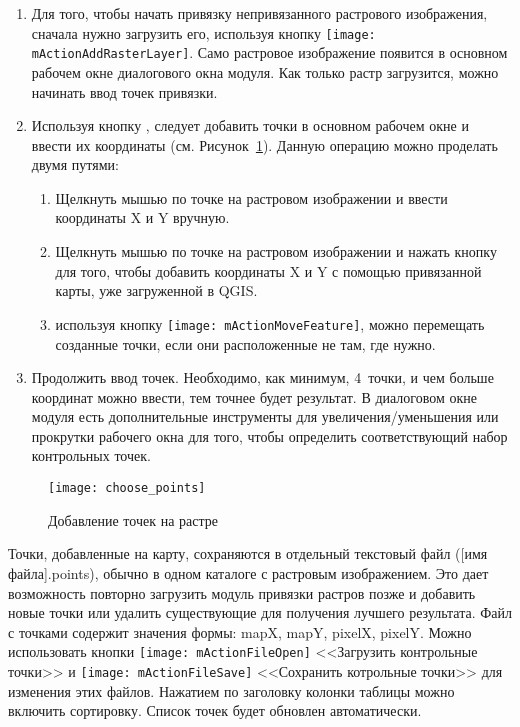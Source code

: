 \begin{enumerate}
\item Для того, чтобы начать привязку непривязанного растрового
изображения, сначала нужно загрузить его, используя кнопку
\texttt{[image: mActionAddRasterLayer]}. Само растровое
изображение появится в основном рабочем окне диалогового окна модуля.
Как только растр загрузится, можно начинать ввод точек привязки.
\item Используя кнопку ,
следует добавить точки в основном рабочем окне и ввести их координаты
(см. Рисунок~\ref{fig:choose_points}). Данную операцию можно проделать
двумя путями:

\begin{enumerate}
\item Щелкнуть мышью по точке на растровом изображении и ввести
координаты X и Y вручную.
\item Щелкнуть мышью по точке на растровом изображении и нажать кнопку
 для того, чтобы добавить координаты X и Y
с помощью привязанной карты, уже загруженной в QGIS.
\item используя кнопку \texttt{[image: mActionMoveFeature]},
можно перемещать созданные точки, если они расположенные не там, где нужно.
\end{enumerate}
\item Продолжить ввод точек. Необходимо, как минимум, 4~точки, и чем
больше координат можно ввести, тем точнее будет результат. В диалоговом
окне модуля есть дополнительные инструменты для увеличения/уменьшения
или прокрутки рабочего окна для того, чтобы определить соответствующий
набор контрольных точек.
\end{enumerate}

\begin{figure}[ht]
\centering
  \texttt{[image: choose\_points]}
  \caption{Добавление точек на растре \wincaption}\label{fig:choose_points}
\end{figure}

Точки, добавленные на карту, сохраняются в отдельный текстовый файл
([имя файла].points), обычно в одном каталоге с растровым изображением.
Это дает возможность повторно загрузить модуль привязки растров позже и
добавить новые точки или удалить существующие для получения лучшего
результата. Файл с точками содержит значения формы: mapX, mapY, pixelX,
pixelY. Можно использовать кнопки
\texttt{[image: mActionFileOpen]} <<Загрузить контрольные точки>> и
\texttt{[image: mActionFileSave]} <<Сохранить котрольные точки>>
для изменения этих файлов. Нажатием по заголовку колонки таблицы можно
включить сортировку. Список точек будет обновлен автоматически.


